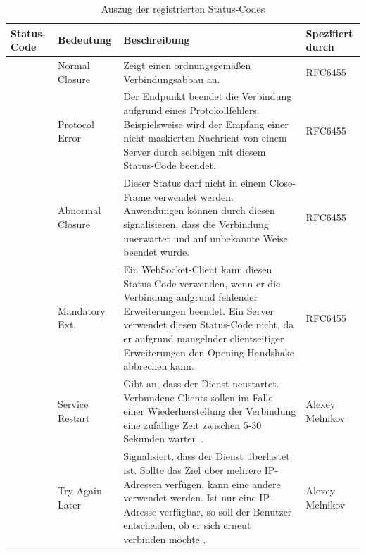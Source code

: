 \documentclass[11pt,a4paper,titlepage]{scrartcl}
\numberwithin{equation}{section}
\begin{document}
\begin{table}[ht]
	\begin{center}
		\begin{tabular}{|>{\centering\arraybackslash}p{1.2cm}|l|>{\arraybackslash}p{8.0cm}|l|}
			\hline
			Status-Code & Bedeutung &  Beschreibung & Spezifiert durch \\ \hline
			1000 & Normal Closure & Zeigt einen ordnungsgemäßen Verbindungsabbau an. & RFC6455  \\ \hline
			1002 & Protocol Error &  Der Endpunkt beendet die Verbindung aufgrund eines Protokollfehlers. Beispielsweise wird der Empfang einer nicht maskierten Nachricht von einem Server durch selbigen mit diesem Status-Code beendet. & RFC6455 \\ \hline
			1006 & Abnormal Closure &  Dieser Status darf nicht in einem Close-Frame verwendet werden. Anwendungen können durch diesen signalisieren, dass die Verbindung unerwartet und auf unbekannte Weise beendet wurde.  & RFC6455 \\ \hline
			1010 & Mandatory Ext. & Ein WebSocket-Client kann diesen Status-Code verwenden, wenn er die Verbindung aufgrund fehlender Erweiterungen beendet. Ein Server verwendet diesen Status-Code nicht, da er aufgrund mangelnder clientseitiger Erweiterungen den Opening-Handshake abbrechen kann. & RFC6455 \\ \hline
			1012 & Service Restart & Gibt an, dass der Dienst neustartet. Verbundene Clients sollen im Falle einer Wiederherstellung der Verbindung eine zufällige Zeit zwischen 5-30 Sekunden warten \autocite{melnikov_additional_2012}. & Alexey Melnikov \\ \hline
			1013 & Try Again Later & Signalisiert, dass der Dienst überlastet ist. Sollte das Ziel über mehrere IP-Adressen verfügen, kann eine andere verwendet werden. Ist nur eine IP-Adresse verfügbar, so soll der Benutzer entscheiden, ob er sich erneut verbinden möchte \autocite{melnikov_additional_2012}. & Alexey Melnikov \\ \hline
		\end{tabular}
		\caption{Auszug der registrierten Status-Codes}\label{tbl:wsCloseCodes}
	\end{center}
\end{table}
\end{document}
